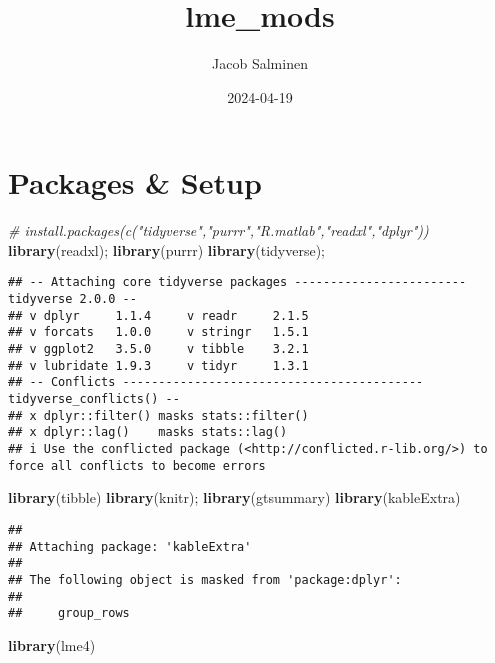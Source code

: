 \documentclass[
]{article}
\title{lme\_mods}
\author{Jacob Salminen}
\date{2024-04-19}
\newenvironment{Shaded}{\begin{snugshade}}{\end{snugshade}}
\newcommand{\CommentTok}[1]{\textcolor[rgb]{0.56,0.35,0.01}{\textit{#1}}}
\newcommand{\FunctionTok}[1]{\textcolor[rgb]{0.13,0.29,0.53}{\textbf{#1}}}
\newcommand{\NormalTok}[1]{#1}
\begin{document}
\maketitle

\hypertarget{packages-setup}{%
\section{Packages \& Setup}\label{packages-setup}}

\begin{Shaded}
\begin{Highlighting}[]
\CommentTok{\# install.packages(c("tidyverse","purrr","R.matlab","readxl","dplyr"))}
\FunctionTok{library}\NormalTok{(readxl);}
\FunctionTok{library}\NormalTok{(purrr)}
\FunctionTok{library}\NormalTok{(tidyverse);}
\end{Highlighting}
\end{Shaded}

\begin{verbatim}
## -- Attaching core tidyverse packages ------------------------ tidyverse 2.0.0 --
## v dplyr     1.1.4     v readr     2.1.5
## v forcats   1.0.0     v stringr   1.5.1
## v ggplot2   3.5.0     v tibble    3.2.1
## v lubridate 1.9.3     v tidyr     1.3.1
## -- Conflicts ------------------------------------------ tidyverse_conflicts() --
## x dplyr::filter() masks stats::filter()
## x dplyr::lag()    masks stats::lag()
## i Use the conflicted package (<http://conflicted.r-lib.org/>) to force all conflicts to become errors
\end{verbatim}

\begin{Shaded}
\begin{Highlighting}[]
\FunctionTok{library}\NormalTok{(tibble)}
\FunctionTok{library}\NormalTok{(knitr);}
\FunctionTok{library}\NormalTok{(gtsummary)}
\FunctionTok{library}\NormalTok{(kableExtra)}
\end{Highlighting}
\end{Shaded}

\begin{verbatim}
## 
## Attaching package: 'kableExtra'
## 
## The following object is masked from 'package:dplyr':
## 
##     group_rows
\end{verbatim}

\begin{Shaded}
\begin{Highlighting}[]
\FunctionTok{library}\NormalTok{(lme4)}
\end{Highlighting}
\end{Shaded}
\end{document}
